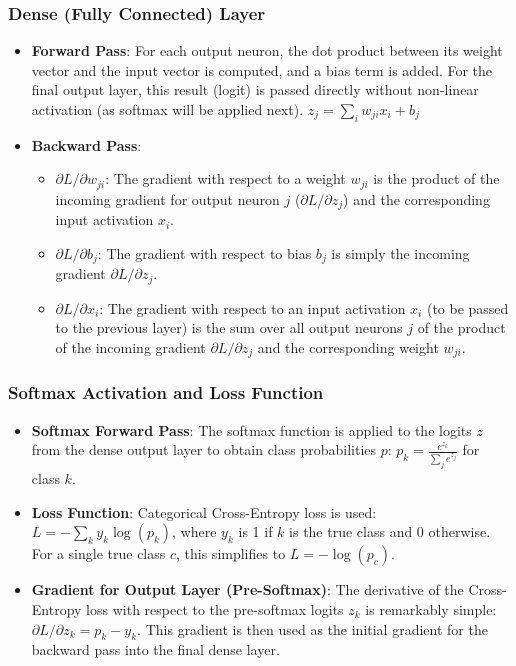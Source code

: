 \documentclass[conference]{IEEEtran}
\begin{document}
\subsubsection{Dense (Fully Connected) Layer}
\begin{itemize}
    \item \textbf{Forward Pass}: For each output neuron, the dot product between its weight vector and the input vector is computed, and a bias term is added. For the final output layer, this result (logit) is passed directly without non-linear activation (as softmax will be applied next).
        $z_j = \sum_{i} w_{ji}x_i + b_j$
    \item \textbf{Backward Pass}:
        \begin{itemize}
            \item $\partial L / \partial w_{ji}$: The gradient with respect to a weight $w_{ji}$ is the product of the incoming gradient for output neuron $j$ ($\partial L / \partial z_j$) and the corresponding input activation $x_i$.
            \item $\partial L / \partial b_j$: The gradient with respect to bias $b_j$ is simply the incoming gradient $\partial L / \partial z_j$.
            \item $\partial L / \partial x_i$: The gradient with respect to an input activation $x_i$ (to be passed to the previous layer) is the sum over all output neurons $j$ of the product of the incoming gradient $\partial L / \partial z_j$ and the corresponding weight $w_{ji}$.
        \end{itemize}
\end{itemize}

\subsubsection{Softmax Activation and Loss Function}
\begin{itemize}
    \item \textbf{Softmax Forward Pass}: The softmax function is applied to the logits $z$ from the dense output layer to obtain class probabilities $p$:
        $p_k = \frac{e^{z_k}}{\sum_{j} e^{z_j}}$ for class $k$.
    \item \textbf{Loss Function}: Categorical Cross-Entropy loss is used:
        $L = -\sum_{k} y_k \log(p_k)$, where $y_k$ is 1 if $k$ is the true class and 0 otherwise. For a single true class $c$, this simplifies to $L = -\log(p_c)$.
    \item \textbf{Gradient for Output Layer (Pre-Softmax)}: The derivative of the Cross-Entropy loss with respect to the pre-softmax logits $z_k$ is remarkably simple:
        $\partial L / \partial z_k = p_k - y_k$. This gradient is then used as the initial gradient for the backward pass into the final dense layer.
\end{itemize}
\end{document}
